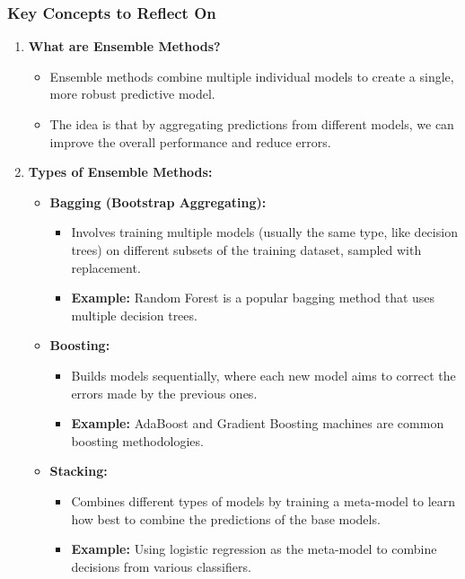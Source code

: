 \documentclass[aspectratio=169]{beamer}
\begin{document}
\begin{frame}[fragile]
    \frametitle{Key Concepts to Reflect On}
    \begin{enumerate}
        \item \textbf{What are Ensemble Methods?}
            \begin{itemize}
                \item Ensemble methods combine multiple individual models to create a single, more robust predictive model. 
                \item The idea is that by aggregating predictions from different models, we can improve the overall performance and reduce errors.
            \end{itemize}
        \item \textbf{Types of Ensemble Methods:}
            \begin{itemize}
                \item \textbf{Bagging (Bootstrap Aggregating):}
                    \begin{itemize}
                        \item Involves training multiple models (usually the same type, like decision trees) on different subsets of the training dataset, sampled with replacement.
                        \item \textbf{Example:} Random Forest is a popular bagging method that uses multiple decision trees.
                    \end{itemize}
                \item \textbf{Boosting:}
                    \begin{itemize}
                        \item Builds models sequentially, where each new model aims to correct the errors made by the previous ones.
                        \item \textbf{Example:} AdaBoost and Gradient Boosting machines are common boosting methodologies.
                    \end{itemize}
                \item \textbf{Stacking:}
                    \begin{itemize}
                        \item Combines different types of models by training a meta-model to learn how best to combine the predictions of the base models.
                        \item \textbf{Example:} Using logistic regression as the meta-model to combine decisions from various classifiers.
                    \end{itemize}
            \end{itemize}
    \end{enumerate}
\end{frame}
\end{document}

